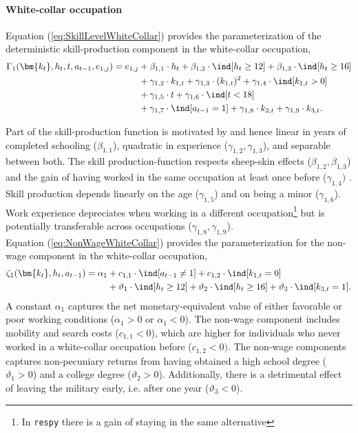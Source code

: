 \paragraph{White-collar occupation} Equation (\ref{eq:SkillLevelWhiteCollar}) provides the parameterization of the deterministic skill-production component in the white-collar occupation,
%
\begin{align}\label{eq:SkillLevelWhiteCollar}
    \Gamma_1(\bm{k_t}, h_t, t, a_{t-1}, e_{1,j}) = e_{1,j} & + \beta_{1,1} \cdot h_t + \beta_{1, 2} \cdot \ind[h_t \geq 12] + \beta_{1,3} \cdot \ind[h_t\geq 16] \nonumber\\
                                 \nonumber & + \gamma_{1, 2} \cdot  k_{1,t} + \gamma_{1,3} \cdot  (k_{1,t})^2 + \gamma_{1,4} \cdot  \ind[k_{1,t} > 0] \\
                                  \nonumber & + \gamma_{1,5} \cdot  t + \gamma_{1,6} \cdot \ind[t < 18] \nonumber\\
                                  & + \gamma_{1,7} \cdot \ind[a_{t-1} = 1] + \gamma_{1,8} \cdot  k_{2,t} + \gamma_{1,9} \cdot  k_{3,t}.
\end{align}
%

Part of the skill-production function is motivated by \citet{Mincer.1958, Mincer.1974} and hence linear in years of completed schooling ($\beta_{1,1}$), quadratic in experience ($\gamma_{1,2}, \gamma_{1,3}$), and separable between both. The skill production-function respects sheep-skin effects ($\beta_{1,2}, \beta_{1,3}$) and the gain of having worked in the same occupation at least once before ($\gamma_{1,4})$ \citep{Spence.1973, Arrow.1973, Hungerford.1987}. Skill production depends linearly on the age ($\gamma_{1,5}$) and on being a minor ($\gamma_{1,6}$). Work experience depreciates when working in a different occupation\footnote{In \texttt{respy} there is a gain of staying in the same alternative} but is potentially transferable across occupations ($\gamma_{1,8}, \gamma_{1,9}$). \\

Equation (\ref{eq:NonWageWhiteCollar}) provides the parameterization for the non-wage component in the white-collar occupation,
%
\begin{align}\label{eq:NonWageWhiteCollar}
\zeta_{1}(\bm{k_t}, h_t, a_{t-1}) = \alpha_1  & + c_{1,1} \cdot \ind[a_{t-1} \neq 1] + c_{1,2} \cdot \ind[k_{1,t} = 0] \nonumber \\
                            & + \vartheta_1 \cdot \ind[h_t \geq 12] + \vartheta_2 \cdot \ind[h_t \geq 16] + \vartheta_3 \cdot \ind[k_{3,t} = 1].
\end{align}
%
A constant $\alpha_1$ captures the net monetary-equivalent value of either favorable or poor working conditions ($\alpha_1 > 0$ or $\alpha_1 < 0$). The non-wage component includes mobility and search costs ($c_{1,1} < 0$), which are higher for individuals who never worked in a white-collar occupation before ($c_{1,2}< 0)$. The non-wage components captures non-pecuniary returns from having obtained a high school degree ($\vartheta_1 >0 $) and a college degree ($\vartheta_2 >0$). Additionally, there is a detrimental effect of leaving the military early, i.e. after one year ($\vartheta_3 < 0$).

